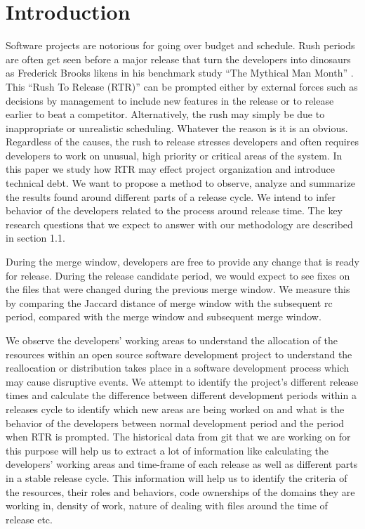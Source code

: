 \documentclass{acm_proc_article-sp}
\begin{document}
\section{Introduction}
Software projects are notorious for going over budget and schedule. Rush periods are often get seen before a major release that turn the developers into dinosaurs as Frederick Brooks likens in his benchmark study ``The Mythical Man Month'' \cite{brooks_mythical}. This ``Rush To Release (RTR)'' can be prompted either by external forces such as decisions by management to include new features in the release or to release earlier to beat a competitor. Alternatively, the rush may simply be due to inappropriate or unrealistic scheduling. Whatever the reason is it is an obvious. Regardless of the causes, the rush to release stresses developers and often requires developers to work on unusual, high priority or critical areas of the system. In this paper we study how RTR may effect project organization and introduce technical debt. We want to propose a method to observe, analyze and summarize the results found around different parts of a release cycle. We intend to infer behavior of the developers related to the process around release time. The key research questions that we expect to answer with our methodology are described in section 1.1.

During the merge window, developers are free to provide any change that is ready for release. During the release candidate period, we would expect to see fixes on the files that were changed during the previous merge window. We measure this by comparing the Jaccard distance of merge window with the subsequent rc period, compared with the merge window and subsequent merge window.

We observe the developers' working areas to understand the allocation of the resources within an open source software development project to understand the reallocation or distribution takes place in a software development process which may cause disruptive events. We attempt to identify the project's different release times and calculate the difference between different development periods within a releases cycle to identify which new areas are being worked on and what is the behavior of the developers between normal development period and the period when RTR is prompted. The historical data from git that we are working on for this purpose will help us to extract a lot of information like calculating the developers' working areas and time-frame of each release as well as different parts in a stable release cycle. This information will help us to identify the criteria of the resources, their roles and behaviors, code ownerships of the domains they are working in, density of work, nature of dealing with files around the time of release etc.
\end{document}
